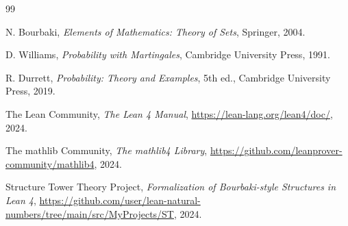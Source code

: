 \documentclass[11pt,a4paper,ja=standard]{ltjsarticle}
\theoremstyle{definition}
\begin{document}
\begin{thebibliography}{99}

N. Bourbaki, \textit{Elements of Mathematics: Theory of Sets}, Springer, 2004.

D. Williams, \textit{Probability with Martingales}, Cambridge University Press, 1991.

R. Durrett, \textit{Probability: Theory and Examples}, 5th ed., Cambridge University Press, 2019.

The Lean Community, \textit{The Lean 4 Manual}, \url{https://lean-lang.org/lean4/doc/}, 2024.

The mathlib Community, \textit{The mathlib4 Library}, \url{https://github.com/leanprover-community/mathlib4}, 2024.

Structure Tower Theory Project, \textit{Formalization of Bourbaki-style Structures in Lean 4},
\url{https://github.com/user/lean-natural-numbers/tree/main/src/MyProjects/ST}, 2024.

\end{thebibliography}
\end{document}
